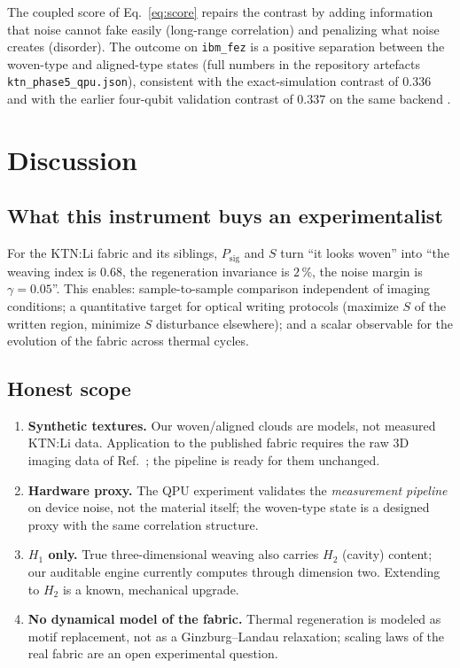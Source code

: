 \documentclass[11pt]{article}
\begin{document}
The coupled score of Eq.~\eqref{eq:score} repairs the contrast by adding
information that noise cannot fake easily (long-range correlation) and
penalizing what noise creates (disorder). The outcome on
\texttt{ibm\_fez} is a positive separation between the woven-type and
aligned-type states (full numbers in the repository artefacts
\texttt{ktn\_phase5\_qpu.json}), consistent with the exact-simulation
contrast of $0.336$ and with the earlier four-qubit validation contrast of
$0.337$ on the same backend \cite{repo}.

\section{Discussion}
\label{sec:limits}

\subsection{What this instrument buys an experimentalist}

For the KTN:Li fabric and its siblings, $P_{\mathrm{sig}}$ and $S$ turn
``it looks woven'' into ``the weaving index is $0.68$, the regeneration
invariance is $2\,\%$, the noise margin is $\gamma=0.05$''. This enables:
sample-to-sample comparison independent of imaging conditions; a
quantitative target for optical writing protocols (maximize $S$ of the
written region, minimize $S$ disturbance elsewhere); and a scalar observable
for the evolution of the fabric across thermal cycles.

\subsection{Honest scope}

\begin{enumerate}
\item \textbf{Synthetic textures.} Our woven/aligned clouds are models, not
measured KTN:Li data. Application to the published fabric requires the raw
3D imaging data of Ref.~\cite{Xin2026}; the pipeline is ready for them
unchanged.
\item \textbf{Hardware proxy.} The QPU experiment validates the
\emph{measurement pipeline} on device noise, not the material itself; the
woven-type state is a designed proxy with the same correlation structure.
\item \textbf{$H_1$ only.} True three-dimensional weaving also carries $H_2$
(cavity) content; our auditable engine currently computes through dimension
two. Extending to $H_2$ is a known, mechanical upgrade.
\item \textbf{No dynamical model of the fabric.} Thermal regeneration is
modeled as motif replacement, not as a Ginzburg--Landau relaxation; scaling
laws of the real fabric are an open experimental question.
\end{enumerate}
\end{document}
